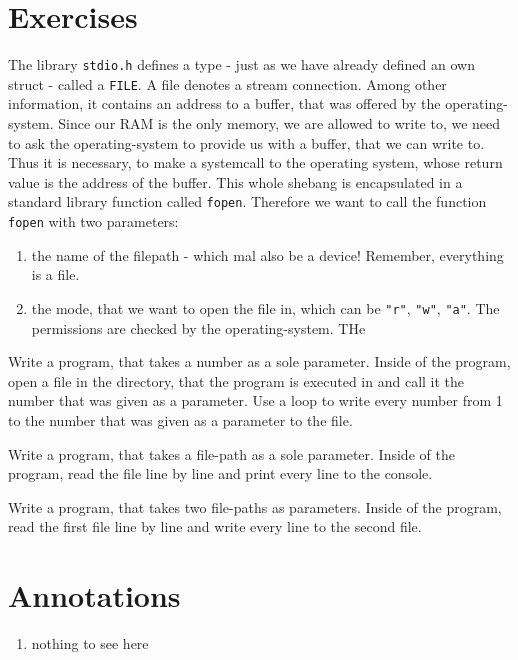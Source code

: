 \documentclass{dcbl/challenge}
\begin{document}
\section*{Exercises}
\begin{aufgabe}
    The library \texttt{stdio.h} defines a type - just as we have already defined an own struct - called a \texttt{FILE}.
    A file denotes a stream connection. 
    Among other information, it contains an address to a buffer, that was offered by the operating-system. 
    Since our RAM is the only memory, we are allowed to write to, we need to ask the operating-system to provide us with a buffer, that we can write to.
    Thus it is necessary, to make a systemcall to the operating system, whose return value is the address of the buffer.
    This whole shebang is encapsulated in a standard library function called \texttt{fopen}.
    Therefore we want to call the function \texttt{fopen} with two parameters:
    \begin{enumerate}
        \item the name of the filepath - which mal also be a device! Remember, everything is a file.
        \item the mode, that we want to open the file in, which can be \texttt{"r"}, \texttt{"w"}, \texttt{"a"}. The permissions are checked by the operating-system. THe 
    \end{enumerate}
\end{aufgabe}
\begin{aufgabe}
    Write a program, that takes a number as a sole parameter.
    Inside of the program, open a file in the directory, that the program is executed in and call it the number that was given as a parameter.
    Use a loop to write every number from 1 to the number that was given as a parameter to the file.
\end{aufgabe}

\begin{aufgabe}
    Write a program, that takes a file-path as a sole parameter.
    Inside of the program, read the file line by line and print every line to the console.
\end{aufgabe}

\begin{aufgabe}
    Write a program, that takes two file-paths as parameters.
    Inside of the program, read the first file line by line and write every line to the second file.
\end{aufgabe}


\section*{Annotations}
\begin{enumerate}
    \item nothing to see here
\end{enumerate}
\end{document}
